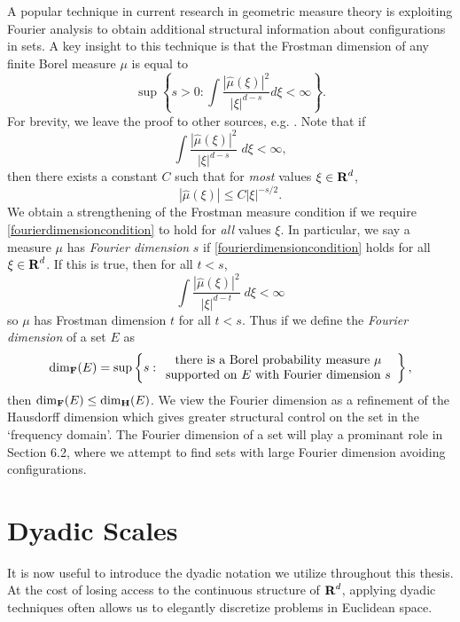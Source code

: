 A popular technique in current research in geometric measure theory is exploiting Fourier analysis to obtain additional structural information about configurations in sets. A key insight to this technique is that the Frostman dimension of any finite Borel measure $\mu$ is equal to
%
\[ \sup \left\{ s > 0 : \int \frac{|\widehat{\mu}(\xi)|^2}{|\xi|^{d-s}} d\xi < \infty \right\}. \]
%
For brevity, we leave the proof to other sources, e.g. \cite[Section 3.5]{Matilla}. Note that if
%
\[ \int \frac{|\widehat{\mu}(\xi)|^2}{|\xi|^{d-s}}\; d\xi < \infty, \]
%
then there exists a constant $C$ such that for \emph{most} values $\xi \in \operatorname{\mathbf{R}}^d$,
%
\begin{equation} \label{fourierdimensioncondition}
    |\widehat{\mu}(\xi)| \leq C |\xi|^{-s/2}.
\end{equation}
%
We obtain a strengthening of the Frostman measure condition if we require \eqref{fourierdimensioncondition} to hold for \emph{all} values $\xi$. In particular, we say a measure $\mu$ has \emph{Fourier dimension} $s$ if \eqref{fourierdimensioncondition} holds for all $\xi \in \operatorname{\mathbf{R}}^d$. If this is true, then for all $t < s$,
%
\[ \int \frac{|\widehat{\mu}(\xi)|^2}{|\xi|^{d-t}}\; d\xi < \infty \]
%
so $\mu$ has Frostman dimension $t$ for all $t < s$. Thus if we define the \emph{Fourier dimension} of a set $E$ as
%
\[ \operatorname{\dim_{\mathbf{F}}}(E) = \sup \left\{ s : \begin{array}{c} \text{there is a Borel probability measure $\mu$}\\ \text{supported on $E$ with Fourier dimension $s$} \end{array} \right\}, \]
%
then $\operatorname{\dim_{\mathbf{F}}}(E) \leq \operatorname{\dim_{\mathbf{H}}}(E)$. We view the Fourier dimension as a refinement of the Hausdorff dimension which gives greater structural control on the set in the `frequency domain'. The Fourier dimension of a set will play a prominant role in Section 6.2, where we attempt to find sets with large Fourier dimension avoiding configurations.











\section{Dyadic Scales} \label{sec:Dyadics}

It is now useful to introduce the dyadic notation we utilize throughout this thesis. At the cost of losing access to the continuous structure of $\operatorname{\mathbf{R}}^d$, applying dyadic techniques often allows us to elegantly discretize problems in Euclidean space.

